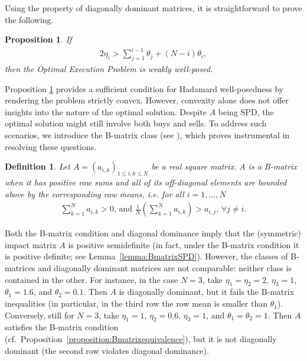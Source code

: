\documentclass[final,3p,authoryear,12pt]{elsarticle}
\newtheorem{definition}{Definition}
\newtheorem{proposition}{Proposition}
\begin{document}
Using the property of diagonally dominant matrices, it is straightforward to prove the following.

\begin{proposition}
\label{proposition:diagdom}
If 
\begin{eqnarray}
    2\eta_{i} > \sum_{j=1}^{i-1}\theta_{j}+(N-i)\theta_{i},
\end{eqnarray}
then the Optimal Execution Problem is weakly well-posed.
\end{proposition}

Proposition \ref{proposition:diagdom} provides a sufficient condition for Hadamard well-posedness by rendering the problem strictly convex. However, convexity alone does not offer insights into the nature of the optimal solution. Despite $A$ being SPD, the optimal solution might still involve both buys and sells. To address such scenarios, we introduce the B-matrix class (see \cite{pena2001class}), which proves instrumental in resolving these questions.

\begin{definition}
    Let $A=(a_{i,k})_{1\le i,k\le N}$ be a real square matrix. A is a B-matrix when it has positive row sums and all of its off-diagonal elements are bounded above by the corresponding row means, i.e. for all $i=1,\dots,N$
    \begin{eqnarray}
    \label{inequality:Bmatdef}
        \sum_{k=1}^{N}a_{i,k}>0 \text{, and } \frac{1}{N}\left(\sum_{k=1}^{N}a_{i,k}\right)>a_{i,j} \text{, }\forall j \neq i.
    \end{eqnarray}
\end{definition}

Both the B-matrix condition and diagonal dominance imply that the (symmetric) impact matrix \(A\) is positive semidefinite (in fact, under the B-matrix condition it is positive definite; see Lemma~\ref{lemma:BmatrixSPD}). However, the classes of B-matrices and diagonally dominant matrices are not comparable: neither class is contained in the other. For instance, in the case \(N=3\), take \(\eta_1=\eta_2=2\), \(\eta_3=1\), \(\theta_1=1.6\), and \(\theta_2=0.1\). Then \(A\) is diagonally dominant, but it fails the B-matrix inequalities (in particular, in the third row the row mean is smaller than \(\theta_1\)). Conversely, still for \(N=3\), take \(\eta_1=1\), \(\eta_2=0.6\), \(\eta_3=1\), and \(\theta_1=\theta_2=1\). Then \(A\) satisfies the B-matrix condition (cf.\ Proposition~\ref{proposition:Bmatrixequivalence}), but it is not diagonally dominant (the second row violates diagonal dominance).
\end{document}
